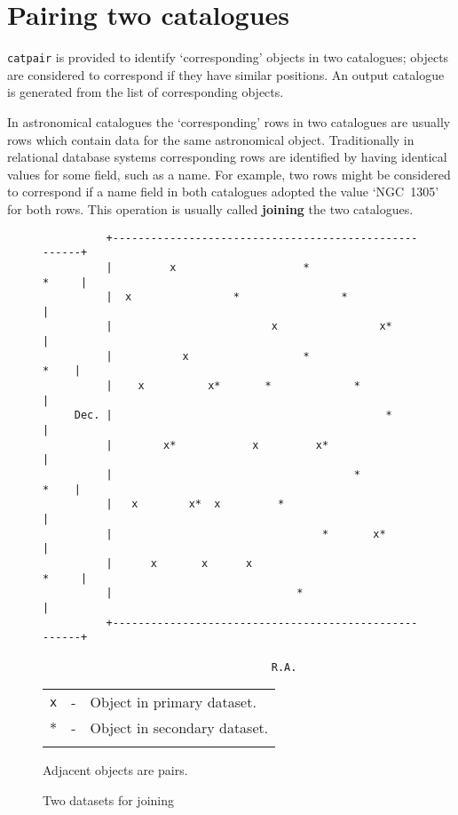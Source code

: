 \documentclass[twoside,11pt]{article}
\newcommand{\xlabel}[1]{}
\renewcommand{\_}{\texttt{\symbol{95}}}
\begin{document}
\section{\xlabel{PAIR}\label{PAIR}Pairing two catalogues}

{\tt catpair} is provided to identify `corresponding' objects
in two catalogues; objects are considered to correspond if they have
similar positions. An output catalogue is generated from the list of
corresponding objects.

In astronomical catalogues the `corresponding' rows in two catalogues
are usually rows which contain data for the same astronomical object.
Traditionally in relational database systems corresponding rows are
identified by having identical values for some field, such as a name.
For example, two rows might be considered to correspond if a name field
in both catalogues adopted the value `NGC~1305' for both rows. This
operation is usually called {\bf joining} the two catalogues.

\begin{figure}[htbp]

\begin{verbatim}
          +------------------------------------------------------+
          |         x                    *                 *     |
          |  x                *                *                 |
          |                         x                x*          |
          |           x                  *                  *    |
          |    x          x*       *             *               |
     Dec. |                                           *          |
          |        x*            x         x*                    |
          |                                      *          *    |
          |   x        x*  x         *                           |
          |                                 *       x*           |
          |      x       x      x                          *     |
          |                             *                        |
          +------------------------------------------------------+

                                    R.A.
\end{verbatim}

\begin{center}
\begin{tabular}{lll}
{\tt x} &  -  &  Object in primary dataset.    \\
$\ast$  &  -  &  Object in secondary dataset.  \\
   &  &  \\
\end{tabular}

Adjacent objects are pairs.
\end{center}

\caption{Two datasets for joining \label{TWO_CAT} }

\end{figure}
\end{document}
